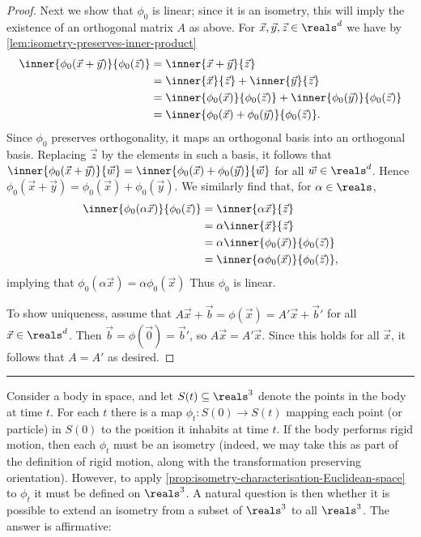 \documentclass[article, a4paper, 11pt, oneside]{memoir}
\numberwithin{equation}{chapter}
\newcommand\fleuronbreak{\fancybreak{\textcolor{linkcolor}{\adfhangingflatleafleft}}}
\begin{document}
\begin{proof}
    Next we show that $\phi_0$ is linear; since it is an isometry, this will imply the existence of an orthogonal matrix $A$ as above. For $\vec{x}, \vec{y}, \vec{z} \in \reals^d$ we have by \cref{lem:isometry-preserves-inner-product}
    \begin{align*}
        \inner{ \phi_0(\vec{x} + \vec{y}) }{ \phi_0(\vec{z}) }
            &= \inner{ \vec{x} + \vec{y} }{ \vec{z} } \\
            &= \inner{ \vec{x} }{ \vec{z} } + \inner{ \vec{y} }{ \vec{z} } \\
            &= \inner{ \phi_0(\vec{x}) }{ \phi_0(\vec{z}) } + \inner{ \phi_0(\vec{y}) }{ \phi_0(\vec{z}) } \\
            &= \inner{ \phi_0(\vec{x}) + \phi_0(\vec{y}) }{ \phi_0(\vec{z}) }.
    \end{align*}
    Since $\phi_0$ preserves orthogonality, it maps an orthogonal basis into an orthogonal basis. Replacing $\vec{z}$ by the elements in such a basis, it follows that $\inner{ \phi_0(\vec{x} + \vec{y}) }{ \vec{w} } = \inner{ \phi_0(\vec{x}) + \phi_0(\vec{y}) }{ \vec{w} }$ for all $\vec{w} \in \reals^d$. Hence $\phi_0(\vec{x} + \vec{y}) = \phi_0(\vec{x}) + \phi_0(\vec{y})$. We similarly find that, for $\alpha \in \reals$,
    \begin{align*}
        \inner{ \phi_0(\alpha \vec{x}) }{ \phi_0(\vec{z}) }
            &= \inner{ \alpha \vec{x} }{ \vec{z} } \\
            &= \alpha \inner{ \vec{x} }{ \vec{z} } \\
            &= \alpha \inner{ \phi_0(\vec{x}) }{ \phi_0(\vec{z}) } \\
            &= \inner{ \alpha \phi_0(\vec{x}) }{ \phi_0(\vec{z}) },
    \end{align*}
    implying that $\phi_0(\alpha \vec{x}) = \alpha \phi_0(\vec{x})$ Thus $\phi_0$ is linear.

    To show uniqueness, assume that $A \vec{x} + \vec{b} = \phi(\vec{x}) = A' \vec{x} + \vec{b}'$ for all $\vec{x} \in \reals^d$. Then $\vec{b} = \phi(\vec{0}) = \vec{b}'$, so $A \vec{x} = A' \vec{x}$. Since this holds for all $\vec{x}$, it follows that $A = A'$ as desired.
\end{proof}

\fleuronbreak

Consider a body in space, and let $S(t) \subseteq \reals^3$ denote the points in the body at time $t$. For each $t$ there is a map $\phi_t \colon S(0) \to S(t)$ mapping each point (or particle) in $S(0)$ to the position it inhabits at time $t$. If the body performs rigid motion, then each $\phi_t$ must be an isometry (indeed, we may take this as part of the definition of rigid motion, along with the transformation preserving orientation). However, to apply \cref{prop:isometry-characterisation-Euclidean-space} to $\phi_t$ it must be defined on $\reals^3$. A natural question is then whether it is possible to extend an isometry from a subset of $\reals^3$ to all $\reals^3$. The answer is affirmative:
\end{document}
